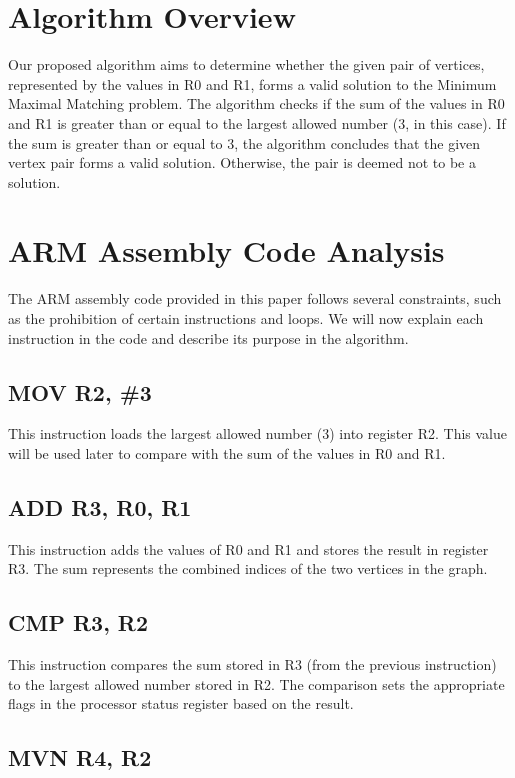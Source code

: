 \section{Algorithm Overview}

Our proposed algorithm aims to determine whether the given pair of vertices, represented by the values in R0 and R1, forms a valid solution to the Minimum Maximal Matching problem. The algorithm checks if the sum of the values in R0 and R1 is greater than or equal to the largest allowed number (3, in this case). If the sum is greater than or equal to 3, the algorithm concludes that the given vertex pair forms a valid solution. Otherwise, the pair is deemed not to be a solution.

\section{ARM Assembly Code Analysis}

The ARM assembly code provided in this paper follows several constraints, such as the prohibition of certain instructions and loops. We will now explain each instruction in the code and describe its purpose in the algorithm.

\subsection{MOV R2, \#3}

This instruction loads the largest allowed number (3) into register R2. This value will be used later to compare with the sum of the values in R0 and R1.

\subsection{ADD R3, R0, R1}

This instruction adds the values of R0 and R1 and stores the result in register R3. The sum represents the combined indices of the two vertices in the graph.

\subsection{CMP R3, R2}

This instruction compares the sum stored in R3 (from the previous instruction) to the largest allowed number stored in R2. The comparison sets the appropriate flags in the processor status register based on the result.

\subsection{MVN R4, R2}

